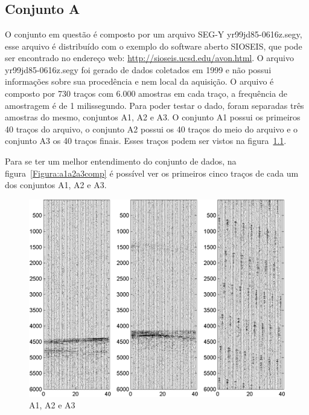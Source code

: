 \chapter{}
\label{Cap:Descricaoconjuntodedados}

\section{Conjunto A}

O conjunto em questão é composto por um arquivo SEG-Y yr99jd85-0616z.segy, esse
arquivo é distribuído com o exemplo do software aberto SIOSEIS, que pode ser
encontrado no endereço web: \url{http://sioseis.ucsd.edu/avon.html}. O arquivo
yr99jd85-0616z.segy foi gerado de dados coletados em 1999 e não possui
informações sobre sua procedência e nem local da aquisição. O arquivo é composto
por 730 traços com 6.000 amostras em cada traço, a frequência de amostragem é de
1 milissegundo. Para poder testar o dado, foram separadas três amostras do
mesmo, conjuntos A1, A2 e A3. O conjunto A1 possui os primeiros 40 traços do arquivo, o
conjunto A2 possui os 40 traços do meio do arquivo e o conjunto A3 os 40 traços
finais. Esses traços podem ser vistos na figura~\ref{Figura:a1a2a3}.

Para se ter um melhor entendimento do conjunto de dados, na
figura~\ref{Figura:a1a2a3comp} é possível ver os primeiros cinco traços de cada
um dos conjuntos A1, A2 e A3.

\begin{figure}[!h]
\centering
\includegraphics[scale=0.75]{fig/fig_A1.png}
\caption{A1, A2 e A3}
\label{Figura:a1a2a3}
\end{figure}

